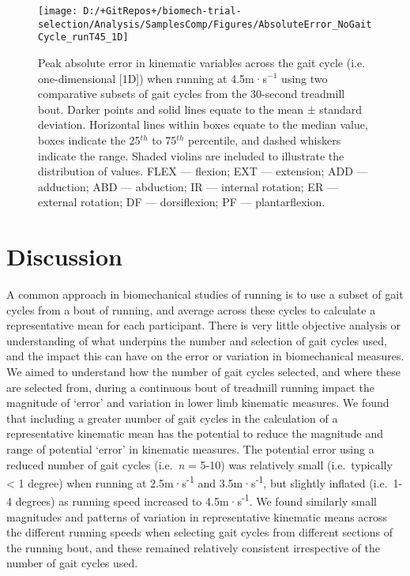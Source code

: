 \documentclass[]{elsarticle} %
\begin{document}
\begin{figure}

{\centering \texttt{[image: D:/+GitRepos+/biomech-trial-selection/Analysis/SamplesComp/Figures/AbsoluteError\_NoGaitCycle\_runT45\_1D]} 

}

\caption{Peak absolute error in kinematic variables across the gait cycle (i.e. one-dimensional [1D]) when running at 4.5m·s$^{-1}$ using two comparative subsets of gait cycles from the 30-second treadmill bout. Darker points and solid lines equate to the mean ± standard deviation. Horizontal lines within boxes equate to the median value, boxes indicate the 25$^{th}$ to 75$^{th}$ percentile, and dashed whiskers indicate the range. Shaded violins are included to illustrate the distribution of values. FLEX — flexion; EXT — extension; ADD — adduction; ABD — abduction; IR — internal rotation; ER — external rotation; DF — dorsiflexion; PF — plantarflexion.}\label{fig:samplesComp_runT45_1D}
\end{figure}

\hypertarget{discussion}{%
\section{Discussion}\label{discussion}}

A common approach in biomechanical studies of running is to use a subset
of gait cycles from a bout of running, and average across these cycles
to calculate a representative mean for each participant. There is very
little objective analysis or understanding of what underpins the number
and selection of gait cycles used, and the impact this can have on the
error or variation in biomechanical measures. We aimed to understand how
the number of gait cycles selected, and where these are selected from,
during a continuous bout of treadmill running impact the magnitude of
`error' and variation in lower limb kinematic measures. We found that
including a greater number of gait cycles in the calculation of a
representative kinematic mean has the potential to reduce the magnitude
and range of potential `error' in kinematic measures. The potential
error using a reduced number of gait cycles (i.e.~\emph{n} = 5-10) was
relatively small (i.e.~typically \textless{} 1 degree) when running at
2.5m·s\textsuperscript{-1} and 3.5m·s\textsuperscript{-1}, but slightly
inflated (i.e.~1-4 degrees) as running speed increased to
4.5m·s\textsuperscript{-1}. We found similarly small magnitudes and
patterns of variation in representative kinematic means across the
different running speeds when selecting gait cycles from different
sections of the running bout, and these remained relatively consistent
irrespective of the number of gait cycles used.
\end{document}
